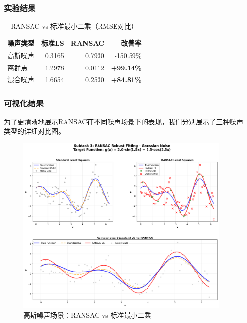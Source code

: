 \documentclass[a4paper,12pt]{article}
\theoremstyle{definition}
\begin{document}
\subsubsection{实验结果}

\begin{table}[H]
\centering
\caption{RANSAC vs 标准最小二乘（RMSE对比）}
\begin{tabular}{lrrr}
\toprule
\textbf{噪声类型} & \textbf{标准LS} & \textbf{RANSAC} & \textbf{改善率} \\
\midrule
高斯噪声 & 0.3165 & 0.7930 & -150.59\% \\
\rowcolor{tablerowcolor}
离群点 & 1.2978 & 0.0112 & \textbf{+99.14\%} \\
\rowcolor{tablerowcolor}
混合噪声 & 1.6654 & 0.2530 & \textbf{+84.81\%} \\
\bottomrule
\end{tabular}
\end{table}

\subsubsection{可视化结果}

为了更清晰地展示RANSAC在不同噪声场景下的表现，我们分别展示了三种噪声类型的详细对比图。

\begin{figure}[H]
\centering
\includegraphics[width=0.95\textwidth]{results/task2/subtask3/comparison_gaussian_noise.png}
\caption{高斯噪声场景：RANSAC vs 标准最小二乘}
\label{fig:task2_subtask3_gaussian}
\end{figure}
\end{document}
